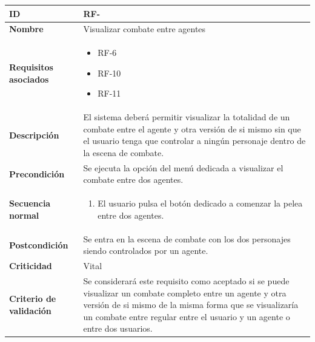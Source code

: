 \begin{center}
	\begin{tabular}{ | p{4.7cm} | p{10cm} | } 
		\hline
		
		\textbf{ID} & RF-\arabic{contador_requisitos_funcionales}
		{contador_requisitos_funcionales} \\
		
		\hline 
		\textbf{Nombre} &
		Visualizar combate entre agentes\\ 
		
		\hline
		\textbf{Requisitos asociados} & 
		\begin{itemize}
			\item RF-6
			\item RF-10
			\item RF-11
		\end{itemize}\\
		
		\hline
		\textbf{Descripción} & 
		El sistema deberá permitir visualizar la totalidad de un combate entre el agente y otra versión de si mismo sin que el usuario tenga que controlar a ningún personaje dentro de la escena de combate.\\
		
		\hline
		\textbf{Precondición} & 
		Se ejecuta la opción del menú dedicada a visualizar el combate entre dos agentes.\\
		
		\hline
		\textbf{Secuencia normal} &
		\begin{enumerate}
			\item El usuario pulsa el botón dedicado a comenzar la pelea entre dos agentes.
		\end{enumerate}
		\\
		
		\hline
		\textbf{Postcondición} & 
		Se entra en la escena de combate con los dos personajes siendo controlados por un agente.\\
		
		\hline 
		\textbf{Criticidad} &
		Vital\\
		
		\hline 
		\textbf{Criterio de validación} & 
		Se considerará este requisito como aceptado si se puede visualizar un combate completo entre un agente y otra versión de si mismo de la misma forma que se visualizaría un combate entre regular entre el usuario y un agente o entre dos usuarios.\\
		
		\hline
	\end{tabular}
\end{center}

